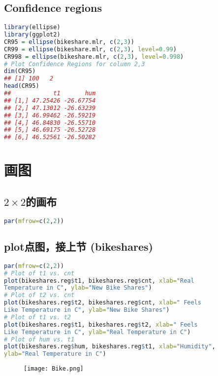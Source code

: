\documentclass[11pt,a4paper]{article}
\begin{document}
\subsection{Confidence regions}
\begin{lstlisting}[language=R]
library(ellipse)
library(ggplot2)
CR95 = ellipse(bikeshare.mlr, c(2,3))
CR99 = ellipse(bikeshare.mlr, c(2,3), level=0.99)
CR998 = ellipse(bikeshare.mlr, c(2,3), level=0.998)
# Plot Confidence Regions for column 2,3
dim(CR95)
## [1] 100   2
head(CR95)
##            t1       hum
## [1,] 47.25426 -26.67754
## [2,] 47.13012 -26.63239
## [3,] 46.99462 -26.59219
## [4,] 46.84830 -26.55710
## [5,] 46.69175 -26.52728
## [6,] 46.52561 -26.50282
\end{lstlisting}








































\section{画图}

\subsection{$2\times2$的画布}
\begin{lstlisting}[language=R]
par(mfrow=c(2,2))
\end{lstlisting}
\subsection{plot点图，接上节 (bikeshares)}
\begin{lstlisting}[language=R]
par(mfrow=c(2,2))
# Plot of t1 vs. cnt
plot(bikeshares.reg$t1, bikeshares.reg$cnt, xlab="Real
Temperature in C", ylab="New Bike Shares")
# Plot of t2 vs. cnt
plot(bikeshares.reg$t2, bikeshares.reg$cnt, xlab=" Feels
Like Temperature in C", ylab="New Bike Shares")
# Plot of t1 vs. t2
plot(bikeshares.reg$t1, bikeshares.reg$t2, xlab=" Feels
Like Temperature in C", ylab="Real Temperature in C")
# Plot of hum vs. t1
plot(bikeshares.reg$hum, bikeshares.reg$t1, xlab="Humidity",
ylab="Real Temperature in C")
\end{lstlisting}
\begin{center}\begin{figure}[htbp]
    \centering
    \texttt{[image: Bike.png]}
    \caption{}
    \label{}
\end{figure}\end{center}
\end{document}
